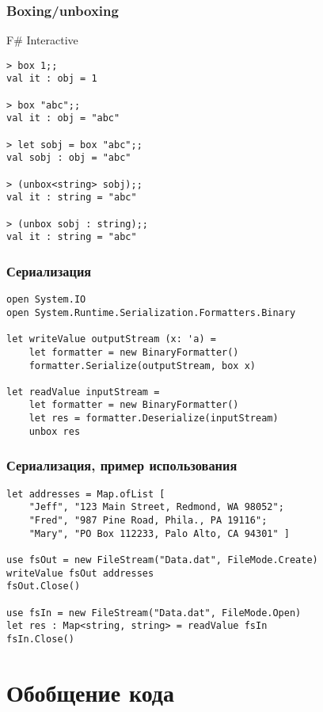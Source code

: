 \documentclass[xetex,mathserif,serif]{beamer}
\begin{document}
    \begin{frame}[fragile]
        \frametitle{Boxing/unboxing}
        \begin{alertblock}{F\# Interactive}
            \begin{verbatim}
> box 1;;
val it : obj = 1

> box "abc";;
val it : obj = "abc"

> let sobj = box "abc";;
val sobj : obj = "abc"

> (unbox<string> sobj);;
val it : string = "abc"

> (unbox sobj : string);;
val it : string = "abc"
            \end{verbatim}
        \end{alertblock}
    \end{frame}

    \begin{frame}[fragile]
        \frametitle{Сериализация}
        \begin{verbatim}
open System.IO
open System.Runtime.Serialization.Formatters.Binary

let writeValue outputStream (x: 'a) =
    let formatter = new BinaryFormatter()
    formatter.Serialize(outputStream, box x)

let readValue inputStream =
    let formatter = new BinaryFormatter()
    let res = formatter.Deserialize(inputStream)
    unbox res
        \end{verbatim}
    \end{frame}

    \begin{frame}[fragile]
        \frametitle{Сериализация, пример использования}
        \begin{verbatim}
let addresses = Map.ofList [ 
    "Jeff", "123 Main Street, Redmond, WA 98052";
    "Fred", "987 Pine Road, Phila., PA 19116";
    "Mary", "PO Box 112233, Palo Alto, CA 94301" ]

use fsOut = new FileStream("Data.dat", FileMode.Create)
writeValue fsOut addresses
fsOut.Close()

use fsIn = new FileStream("Data.dat", FileMode.Open)
let res : Map<string, string> = readValue fsIn
fsIn.Close()
        \end{verbatim}
    \end{frame}

    \section{Обобщение кода}
\end{document}
